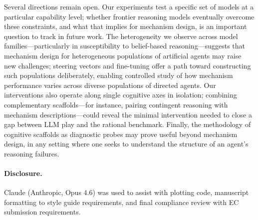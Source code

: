 \documentclass[format=acmsmall, review=false]{acmart}
\begin{document}
Several directions remain open. Our experiments test a specific set of models at a particular capability level; whether frontier reasoning models eventually overcome these constraints, and what that implies for mechanism design, is an important question to track in future work. The heterogeneity we observe across model families---particularly in susceptibility to belief-based reasoning---suggests that mechanism design for heterogeneous populations of artificial agents may raise new challenges; steering vectors and fine-tuning offer a path toward constructing such populations deliberately, enabling controlled study of how mechanism performance varies across diverse populations of directed agents. Our interventions also operate along single cognitive axes in isolation; combining complementary scaffolds---for instance, pairing contingent reasoning with mechanism descriptions---could reveal the minimal intervention needed to close a  gap between LLM play and the rational benchmark. Finally, the methodology of cognitive scaffolds as diagnostic probes may prove useful beyond mechanism design, in any setting where one seeks to understand the structure of an agent's reasoning failures.


\paragraph{Disclosure.} Claude (Anthropic, Opus 4.6) was used to assist with plotting code, manuscript formatting to style guide requirements, and final compliance review with EC submission requirements.





\appendix


\end{document}
